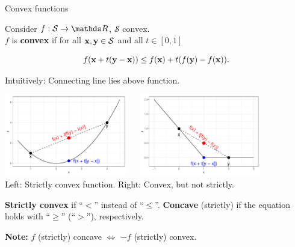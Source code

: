 \documentclass[11pt,compress,t,notes=noshow, xcolor=table]{beamer}
\begin{document}
\begin{vbframe}{Convex functions}

Consider $f: \mathcal{S} \to \R$, $\mathcal{S}$ convex.\\
$f$ is \textbf{convex} if for all $\mathbf{x}, \mathbf{y} \in \mathcal{S}$ and all $t \in [0, 1]$

\vspace*{-0.2cm}

$$
f(\mathbf{x} + t(\mathbf{y} - \mathbf{x})) \le f(\mathbf{x}) + t(f(\mathbf{y}) - f(\mathbf{x})).
$$

Intuitively: Connecting line lies above function.

\begin{center}
\includegraphics[width = 0.4\textwidth, keepaspectratio]{figure_man/convexity_1.pdf}~~~\includegraphics[width = 0.40\textwidth, keepaspectratio]{figure_man/convexity_2.pdf} \\
\footnotesize{Left: Strictly convex function. Right: Convex, but not strictly. }
\end{center}

\textbf{Strictly convex} if \enquote{$<$} instead of \enquote{$\le$}. \textbf{Concave} (strictly) if the equation holds with \enquote{$\ge$} (\enquote{$>$}), respectively. 

\vspace*{0.2cm}

\textbf{Note:} $f$ (strictly) concave $\Leftrightarrow$ $-f$ (strictly) convex.



\end{vbframe}
\end{document}
